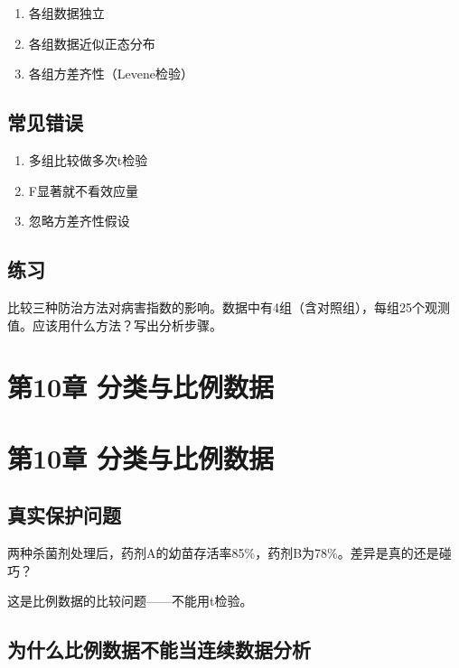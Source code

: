 \documentclass[
  letterpaper,
]{scrbook}
\providecommand{\tightlist}{%
  \setlength{\itemsep}{0pt}\setlength{\parskip}{0pt}}
\begin{document}
\begin{enumerate}
\def\labelenumi{\arabic{enumi}.}
\tightlist
\item
  各组数据独立
\item
  各组数据近似正态分布
\item
  各组方差齐性（Levene检验）
\end{enumerate}

\section{常见错误}\label{ux5e38ux89c1ux9519ux8bef-6}

\begin{enumerate}
\def\labelenumi{\arabic{enumi}.}
\tightlist
\item
  多组比较做多次t检验
\item
  F显著就不看效应量
\item
  忽略方差齐性假设
\end{enumerate}

\section{练习}\label{ux7ec3ux4e60-8}

比较三种防治方法对病害指数的影响。数据中有4组（含对照组），每组25个观测值。应该用什么方法？写出分析步骤。

\chapter{第10章
分类与比例数据}\label{ux7b2c10ux7ae0-ux5206ux7c7bux4e0eux6bd4ux4f8bux6570ux636e}

\chapter{第10章
分类与比例数据}\label{ux7b2c10ux7ae0-ux5206ux7c7bux4e0eux6bd4ux4f8bux6570ux636e-1}

\section{真实保护问题}\label{ux771fux5b9eux4fddux62a4ux95eeux9898-7}

两种杀菌剂处理后，药剂A的幼苗存活率85\%，药剂B为78\%。差异是真的还是碰巧？

这是比例数据的比较问题------不能用t检验。

\section{为什么比例数据不能当连续数据分析}\label{ux4e3aux4ec0ux4e48ux6bd4ux4f8bux6570ux636eux4e0dux80fdux5f53ux8fdeux7eedux6570ux636eux5206ux6790}
\end{document}
